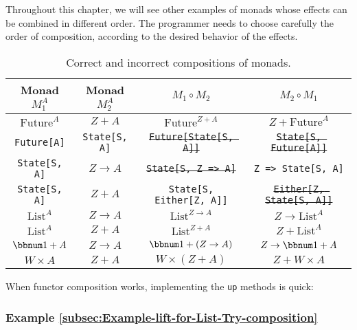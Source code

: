 Throughout this chapter, we will see other examples of monads whose
effects can be combined in different order. The programmer needs to
choose carefully the order of composition, according to the desired
behavior of the effects.
\begin{center}
\begin{table}[h]
\begin{centering}
\begin{tabular}{|c|c|c|c|}
\hline 
\textbf{\small{}Monad $M_{1}^{A}$} & \textbf{\small{}Monad $M_{2}^{A}$} & \textbf{\small{}$M_{1}\circ M_{2}$} & \textbf{\small{}$M_{2}\circ M_{1}$}\tabularnewline
\hline 
\hline 
{\small{}$\text{Future}^{A}$} & {\small{}$Z+A$} & {\small{}$\text{Future}^{Z+A}$} & {\small{}\sout{\mbox{$Z+\text{Future}^{A}$}}}\tabularnewline
\hline 
\texttt{\small{}Future{[}A{]}} & \texttt{\small{}State{[}S, A{]}} & \texttt{\small{}\sout{Future{[}State{[}S, A{]}{]}}} & \texttt{\small{}\sout{State{[}S, Future{[}A{]}{]}}}\tabularnewline
\hline 
\texttt{\small{}State{[}S, A{]}} & {\small{}$Z\rightarrow A$} & \texttt{\small{}\sout{State{[}S, Z => A{]}}} & \texttt{\small{}Z => State{[}S, A{]}}\tabularnewline
\hline 
\texttt{\small{}State{[}S, A{]}} & {\small{}$Z+A$} & \texttt{\small{}State{[}S, Either{[}Z, A{]}{]}} & \texttt{\small{}\sout{Either{[}Z, State{[}S, A{]}{]}}}\tabularnewline
\hline 
{\small{}$\text{List}^{A}$} & {\small{}$Z\rightarrow A$} & {\small{}\sout{\mbox{$\text{List}^{Z\rightarrow A}$}}} & {\small{}$Z\rightarrow\text{List}^{A}$}\tabularnewline
\hline 
{\small{}$\text{List}^{A}$} & {\small{}$Z+A$} & {\small{}$\text{List}^{Z+A}$} & {\small{}\sout{\mbox{$Z+\text{List}^{A}$}}}\tabularnewline
\hline 
{\small{}$\bbnum 1+A$} & {\small{}$Z\rightarrow A$} & {\small{}\sout{\mbox{$\bbnum 1+\left(Z\rightarrow A\right)$}}} & {\small{}$Z\rightarrow\bbnum 1+A$}\tabularnewline
\hline 
{\small{}$W\times A$} & {\small{}$Z+A$} & {\small{}$W\times\left(Z+A\right)$} & {\small{}$Z+W\times A$}\tabularnewline
\hline 
\end{tabular}
\par\end{centering}
\caption{\label{tab:Correct-and-incorrect-compositions}Correct and incorrect
compositions of monads.}
\end{table}
\par\end{center}

When functor composition works, implementing the \lstinline!up! methods
is quick:

\subsubsection{Example \label{subsec:Example-lift-for-List-Try-composition}\ref{subsec:Example-lift-for-List-Try-composition}}

